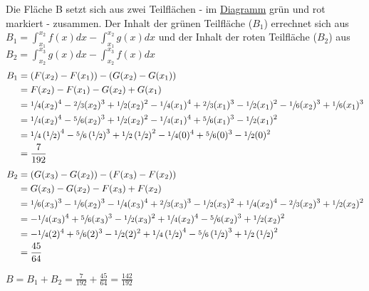 \documentclass{article}
\begin{document}
Die Fläche B setzt sich aus zwei Teilflächen - im \hyperref[dia:4]{Diagramm}
grün und rot markiert - zusammen.
Der Inhalt der grünen Teilfläche ($B_1$) errechnet sich aus
$B_1 = \int_{x_1}^{x_2} f(x) dx - \int_{x_1}^{x_2} g(x) dx$ und der Inhalt der roten
Teilfläche ($B_2$) aus
$B_2 = \int_{x_2}^{x_3} g(x) dx - \int_{x_2}^{x_3} f(x) dx$
\begin{align*}
  B_1 &= \left( F(x_2) - F(x_1) \right) - \left( G(x_2) - G(x_1) \right) \\
      &= F(x_2) - F(x_1) - G(x_2) + G(x_1) \\
      &= \sfrac{1}{4}(x_2)^4 - \sfrac{2}{3}(x_2)^3 + \sfrac{1}{2}(x_2)^2 - \sfrac{1}{4}(x_1)^4 + \sfrac{2}{3}(x_1)^3 - \sfrac{1}{2}(x_1)^2 -
        \sfrac{1}{6}(x_2)^3 + \sfrac{1}{6}(x_1)^3 \\
      &= \sfrac{1}{4}(x_2)^4 - \sfrac{5}{6}(x_2)^3 + \sfrac{1}{2}(x_2)^2 - \sfrac{1}{4}(x_1)^4 + \sfrac{5}{6}(x_1)^3 - \sfrac{1}{2}(x_1)^2 \\
      &= \sfrac{1}{4}\left(\sfrac{1}{2}\right)^4 - \sfrac{5}{6}\left(\sfrac{1}{2}\right)^3 + \sfrac{1}{2}\left(\sfrac{1}{2}\right)^2 -
        \sfrac{1}{4}(0)^4 + \sfrac{5}{6}(0)^3 - \sfrac{1}{2}(0)^2 \\
      &= \frac{7}{192}
\end{align*}
\begin{align*}
  B_2 &=\left( G(x_3) - G(x_2) \right) - \left( F(x_3) - F(x_2) \right) \\
      &= G(x_3) - G(x_2) - F(x_3) + F(x_2) \\
      &= \sfrac{1}{6}(x_3)^3 - \sfrac{1}{6}(x_2)^3 - \sfrac{1}{4}(x_3)^4 + \sfrac{2}{3}(x_3)^3 - \sfrac{1}{2}(x_3)^2 +
        \sfrac{1}{4}(x_2)^4 - \sfrac{2}{3}(x_2)^3 + \sfrac{1}{2}(x_2)^2 \\
      &= - \sfrac{1}{4}(x_3)^4 + \sfrac{5}{6}(x_3)^3 - \sfrac{1}{2}(x_3)^2 +
        \sfrac{1}{4}(x_2)^4 - \sfrac{5}{6}(x_2)^3 + \sfrac{1}{2}(x_2)^2 \\
      &= - \sfrac{1}{4}(2)^4 + \sfrac{5}{6}(2)^3 - \sfrac{1}{2}(2)^2 + \sfrac{1}{4}\left(\sfrac{1}{2}\right)^4 -
        \sfrac{5}{6}\left(\sfrac{1}{2}\right)^3 + \sfrac{1}{2}\left(\sfrac{1}{2}\right)^2 \\
      &= \frac{45}{64}
\end{align*}

$B = B_1 + B_2 = \frac{7}{192} + \frac{45}{64} = \frac{142}{192}$
\end{document}
